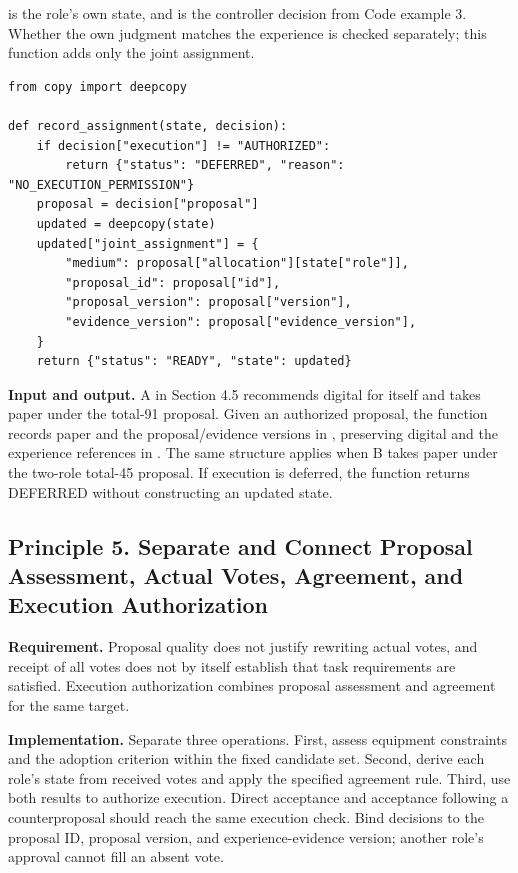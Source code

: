 \documentclass[10pt,a4paper]{article}
\begin{document}
\texttt{} is the role's own state, and \texttt{} is the controller decision from Code example 3. Whether the own judgment matches the experience is checked separately; this function adds only the joint assignment.

\noindent\begin{minipage}{\linewidth}
\begin{verbatim}
from copy import deepcopy

def record_assignment(state, decision):
    if decision["execution"] != "AUTHORIZED":
        return {"status": "DEFERRED", "reason": "NO_EXECUTION_PERMISSION"}
    proposal = decision["proposal"]
    updated = deepcopy(state)
    updated["joint_assignment"] = {
        "medium": proposal["allocation"][state["role"]],
        "proposal_id": proposal["id"],
        "proposal_version": proposal["version"],
        "evidence_version": proposal["evidence_version"],
    }
    return {"status": "READY", "state": updated}
\end{verbatim}
\end{minipage}\par

\textbf{Input and output.} A in Section 4.5 recommends digital for itself and takes paper under the total-91 proposal. Given an authorized proposal, the function records paper and the proposal/evidence versions in \texttt{}, preserving digital and the experience references in \texttt{}. The same structure applies when B takes paper under the two-role total-45 proposal. If execution is deferred, the function returns DEFERRED without constructing an updated state.

\subsection{Principle 5. Separate and Connect Proposal Assessment, Actual Votes, Agreement, and Execution Authorization}\label{two-role-failure-design-principle-5.-separate-and-connect-proposal-assessment-actual-votes-agreement-and-execution-authorization}

\textbf{Requirement.} Proposal quality does not justify rewriting actual votes, and receipt of all votes does not by itself establish that task requirements are satisfied. Execution authorization combines proposal assessment and agreement for the same target.

\textbf{Implementation.} Separate three operations. First, assess equipment constraints and the adoption criterion within the fixed candidate set. Second, derive each role's state from received votes and apply the specified agreement rule. Third, use both results to authorize execution. Direct acceptance and acceptance following a counterproposal should reach the same execution check. Bind decisions to the proposal ID, proposal version, and experience-evidence version; another role's approval cannot fill an absent vote.
\end{document}
